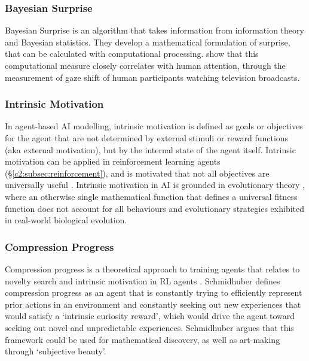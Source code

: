 \subsubsection{Bayesian Surprise}

Bayesian Surprise \citep{itti2005bayesian,itti2009bayesian} is an algorithm that takes information from information theory and Bayesian statistics. 
They develop a mathematical formulation of surprise, that can be calculated with computational processing.
\cite{itti2005bayesian,itti2009bayesian} show that this computational measure closely correlates with human attention, through the measurement of gaze shift of human participants watching television broadcasts.

\subsubsection{Intrinsic Motivation}

In agent-based AI modelling, intrinsic motivation is defined as goals or objectives for the agent that are not determined by external stimuli or reward functions (aka external motivation), but by the internal state of the agent itself. 
Intrinsic motivation can be applied in reinforcement learning agents \citep{chentanez2004intrinsically} (\S \ref{c2:subsec:reinforcement}), and is motivated that not all objectives are universally useful \citep{barto2013intrinsic}.
Intrinsic motivation in AI is grounded in evolutionary theory \citep{singh2010intrinsically}, where an otherwise single mathematical function that defines a universal fitness function does not account for all behaviours and evolutionary strategies exhibited in real-world biological evolution.

\subsubsection{Compression Progress}

Compression progress \citep{schmidhuber2008driven} is a theoretical approach to training agents that relates to novelty search \citep{lehman2008exploiting} and intrinsic motivation in RL agents \citep{chentanez2004intrinsically}.
Schmidhuber defines compression progress as an agent that is constantly trying to efficiently represent prior actions in an environment and constantly seeking out new experiences that would satisfy a `intrinsic curiosity reward', which would drive the agent toward seeking out novel and unpredictable experiences.
Schmidhuber argues that this framework could be used for mathematical discovery, as well as art-making through `subjective beauty'.

